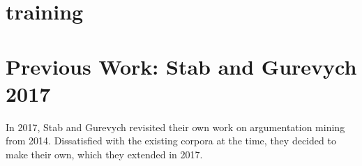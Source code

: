 \documentclass[12]{article}
\theoremstyle{mytheoremstyle}
\theoremstyle{mytheoremstyle}
\theoremstyle{myproblemstyle}
\begin{document}
  \section{training\dotfill}
  \section{Previous Work: Stab and Gurevych 2017\dotfill}
  In 2017, Stab and Gurevych revisited their own work on argumentation mining from 2014. Dissatisfied with the existing corpora at the time, they decided to make their own, which they extended in 2017. 
\end{document}
